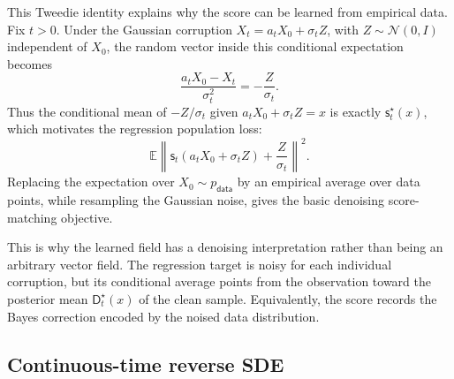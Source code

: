 \documentclass[10pt,a4paper]{amsart}
\numberwithin{equation}{section}
\newcommand{\E}{\mathbb{E}}
\newcommand{\Id}{I}
\newcommand{\norm}[1]{\left\lVert #1 \right\rVert}
\newcommand{\pdata}{p_{\mathsf{data}}}
\newcommand{\sstar}{\mathsf{s}^{\star}}
\newcommand{\score}{\mathsf{s}}
\newcommand{\dstar}{\mathsf{D}^{\star}}
\newcommand{\normal}[2]{\mathcal{N}\!\left(#1,#2\right)}
\begin{document}
This Tweedie identity explains why the score can be learned from empirical data.
Fix $t>0$.
Under the Gaussian corruption $X_t=a_tX_0+\sigma_t Z$, with
$Z\sim\normal{0}{\Id}$ independent of $X_0$, the random vector inside this
conditional expectation becomes
\[
    \frac{a_tX_0-X_t}{\sigma_t^2}
    =
    -\frac{Z}{\sigma_t}.
\]
Thus the conditional mean of $-Z/\sigma_t$ given $a_tX_0+\sigma_t Z=x$ is
exactly $\sstar_t(x)$, which motivates the regression population loss:
\[
    \E\norm{
        \score_t(a_tX_0+\sigma_t Z)+\frac{Z}{\sigma_t}
    }^2.
\]
Replacing the expectation over
$X_0\sim\pdata$ by an empirical average over data points, while resampling the
Gaussian noise, gives the basic denoising score-matching objective.

This is why the learned field has a denoising interpretation rather than being
an arbitrary vector field.  The regression target is noisy for each individual
corruption, but its conditional average points from the observation toward the
posterior mean $\dstar_t(x)$ of the clean sample.  Equivalently, the score
records the Bayes correction encoded by the noised data distribution.



\subsection{Continuous-time reverse SDE}
\end{document}
